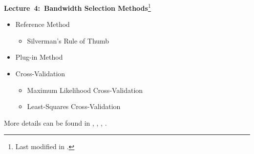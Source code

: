 \documentclass[19pt,landscape]{article}
\begin{document}
%

%

\newpage
{\LARGE\centerline{\textbf{Lecture~4:~Bandwidth Selection Methods}\footnote{Last modified in .}}}
\vskip25pt
\begin{minipage}{.9\textwidth}
    \Large
\begin{itemize}
\item Reference Method
\begin{itemize}
    \item Silverman's Rule of Thumb
\end{itemize}
\item Plug-in Method
    \item Cross-Validation 
    \begin{itemize}
        \item Maximum Likelihood Cross-Validation
        \item Least-Squares Cross-Validation
    \end{itemize}

\end{itemize}
More details can be found in \cite{hall91minima}, \cite{hall91lower}, \cite{hall92smoothed}, \cite{hardle12}.
\end{minipage}
\end{document}
